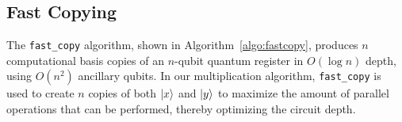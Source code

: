 \documentclass[reprint,amsmath,amssymb,aps,pra]{revtex4-2}
\begin{document}

\subsection{Fast Copying}\label{subsec:fast_copy}

The \texttt{fast\_copy} algorithm, shown in Algorithm~\ref{algo:fastcopy},
produces $n$ computational basis copies of an $n$-qubit quantum register in
$O(\log n)$ depth, using $O(n^2)$ ancillary qubits. In our multiplication algorithm, \texttt{fast\_copy} is used to create $n$ copies of both $\ket{x}$ and $\ket{y}$ to maximize the amount of parallel operations that can be performed, thereby optimizing the circuit depth.
\end{document}
